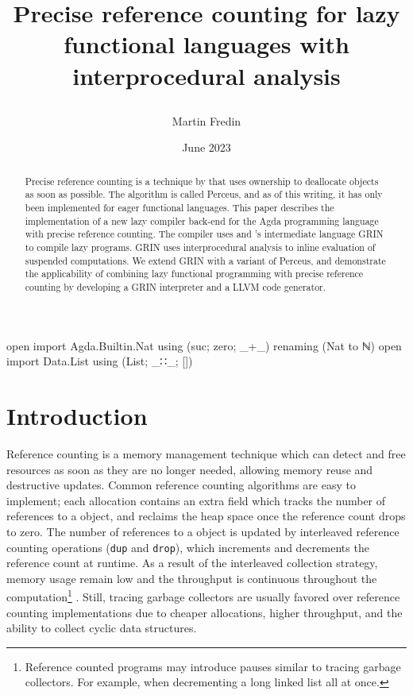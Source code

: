 \documentclass[10pt, twocolumn]{article}
\title{
Precise reference counting for lazy functional languages with interprocedural analysis 

}
\author{Martin Fredin}
\date{June 2023}
\begin{document}
\maketitle


\begin{code}[hide]
open import Agda.Builtin.Nat using (suc; zero; _+_) renaming (Nat to ℕ) 
open import Data.List using (List; _∷_; [])
\end{code}


\begin{abstract}
Precise reference counting is a technique by \citeauthor{reinking2021} that uses ownership to deallocate objects as soon as possible. 
The algorithm is called Perceus, and as of this writing, it has only been implemented for eager functional languages.
This paper describes the implementation of a new lazy compiler back-end for the Agda programming language with 
precise reference counting. 
The compiler uses \citeauthor{boquist1999} and \citeauthor{johnsson1991}'s intermediate language GRIN to compile lazy programs. 
GRIN uses interprocedural analysis to inline evaluation of suspended computations.
We extend GRIN with a variant of Perceus, and demonstrate the applicability of combining lazy functional programming with precise reference counting by developing a GRIN interpreter and a LLVM code generator. 
\end{abstract}

\section{Introduction}

Reference counting \citep{collins1960} is a memory management technique which can detect and free resources as soon as they are no longer needed, allowing memory reuse and destructive updates. 
Common reference counting algorithms are easy to implement; each allocation contains an extra field which tracks the number of references to a object, and reclaims the heap space once the reference count drops to zero.
The number of references to a object is updated by interleaved reference counting operations (\texttt{dup} and \texttt{drop}), which increments and decrements the reference count at runtime. 
As a result of the interleaved collection strategy, memory usage remain low and the throughput is continuous throughout the computation\footnote{Reference counted programs may introduce pauses similar to tracing garbage collectors. For example, when decrementing a long linked list all at once.} \citep{jones1996}.
Still, tracing garbage collectors are usually favored over reference counting implementations due to cheaper allocations, higher throughput, and the ability to collect cyclic data structures.
\end{document}
